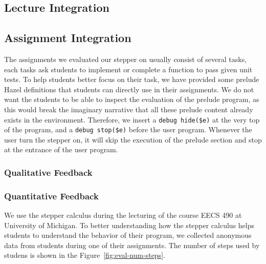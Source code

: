 
\subsection{Lecture Integration}


\subsection{Assignment Integration}

The assignments we evaluated our stepper on usually consist of several
tasks, each tasks ask students to implement or complete a function to
pass given unit tests. To help students better focus on their task, we
have provided some prelude Hazel definitions that students can
directly use in their assignments. We do not want the students to be
able to inspect the evaluation of the prelude program, as this would
break the imaginary narrative that all these prelude content already
exists in the environment. Therefore, we insert a
\lstinline[language=hazel]{debug hide($e)} at the very top of the
program, and a \lstinline[language=hazel]{debug stop($e)} before the
user program. Whenever the user turn the stepper on, it will skip the
execution of the prelude section and stop at the entrance of the user
program.

\subsubsection{Qualitative Feedback}


\subsubsection{Quantitative Feedback}

We use the stepper calculus during the lecturing of the course EECS
490 at University of Michigan. To better understanding how the stepper
calculus helps students to understand the behavior of their program,
we collected anonymous data from students during one of their
assignments. The number of steps used by studens is shown in the
Figure~\ref{fig:eval-num-steps}.

